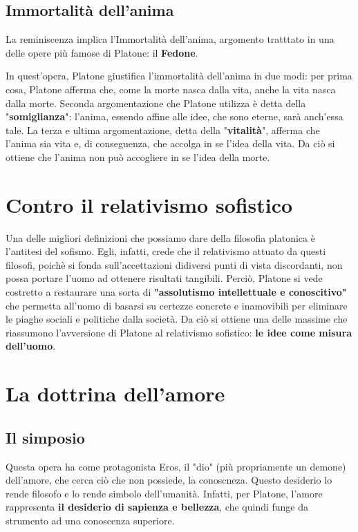 \documentclass[10pt,a4paper]{article}
\begin{document}
	 \subsection{Immortalità dell'anima}

	 La reminiscenza implica l'Immortalità dell'anima, argomento tratttato in una delle opere più famose di Platone: il \textbf{Fedone}.

	 In quest'opera, Platone giustifica l'immortalità dell'anima in due modi: per prima cosa, Platone afferma che, come la morte nasca dalla vita, anche la vita nasca dalla morte. Seconda argomentazione che Platone utilizza è detta della "\textbf{somiglianza}": l'anima, essendo affine alle idee, che sono eterne, sarà anch'essa tale. La terza e ultima argomentazione, detta della "\textbf{vitalità}", afferma che l'anima sia vita e, di conseguenza, che accolga in se l'idea della vita. Da ciò si ottiene che l'anima non può accogliere in se l'idea della morte.

	 \section{Contro il relativismo sofistico}

	 Una delle migliori definizioni che possiamo dare della filosofia platonica è l'antitesi del sofismo. Egli, infatti, crede che il relativismo attuato da questi filosofi, poichè si fonda sull'accettazioni didiversi punti di vista discordanti, non possa portare l'uomo ad ottenere risultati tangibili. Perciò, Platone si vede costretto a restaurare una sorta di \textbf{"assolutismo intellettuale e conoscitivo"} che permetta all'uomo di basarsi su certezze concrete e inamovibili per eliminare le piaghe sociali e politiche dalla società. Da ciò si ottiene una delle massime che riassumono l'avversione di Platone al relativismo sofistico: \textbf{le idee come misura dell'uomo}.

	 \section{La dottrina dell'amore}

	 \subsection{Il simposio}

	 Questa opera ha come protagonista Eros, il "dio" (più propriamente un demone) dell'amore, che cerca ciò che non possiede, la conoscneza. Questo desiderio lo rende filosofo e lo rende simbolo dell'umanità. Infatti, per Platone, l'amore rappresenta \textbf{il desiderio di sapienza e bellezza}, che quindi funge da strumento ad una conoscenza superiore.
\end{document}
